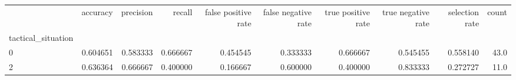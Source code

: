 \begin{tabular}{lrrrrrrrrr}
\toprule
{} &  accuracy &  precision &    recall &  false positive rate &  false negative rate &  true positive rate &  true negative rate &  selection rate &  count \\
tactical\_situation &           &            &           &                      &                      &                     &                     &                 &        \\
\midrule
0                  &  0.604651 &   0.583333 &  0.666667 &             0.454545 &             0.333333 &            0.666667 &            0.545455 &        0.558140 &   43.0 \\
2                  &  0.636364 &   0.666667 &  0.400000 &             0.166667 &             0.600000 &            0.400000 &            0.833333 &        0.272727 &   11.0 \\
\bottomrule
\end{tabular}
